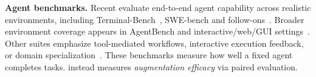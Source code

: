 \textbf{Agent benchmarks.}
Recent evaluate end-to-end agent capability across realistic environments, including Terminal-Bench~\citep{merrill2026terminalbenchbenchmarkingagentshard}, SWE-bench and follow-ons~\citep{jimenez2024swebench,yang2024sweagent,yang2025swesmith}.
Broader environment coverage appears in AgentBench and interactive/web/GUI settings~\citep{liu2023agentbench,zhou2024webarena,koh2024visualwebarena,xie2024osworld}.
Other suites emphasize tool-mediated workflows, interactive execution feedback, or domain specialization~\citep{yao2025taubench,trivedi2024appworld,yang2023intercode,chan2025mlebench,zhang2025cybench,zhuo2025bigcodebench,austin2021programsynthesis,ye2025replicationbenchaiagentsreplicate}.
These benchmarks measure how well a fixed agent completes tasks. \benchmarkName{} instead measures \emph{augmentation efficacy} via paired evaluation.



